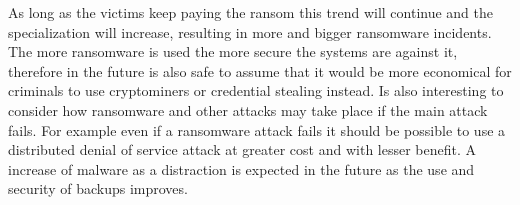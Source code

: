 \linej
As long as the victims keep paying the ransom this trend will continue and the specialization will increase, resulting in more and bigger ransomware incidents.
The more ransomware is used the more secure the systems are against it, therefore in the future is also safe to assume that it would be more economical for criminals to use cryptominers or credential stealing instead\cite{ransomware_malwarebytes}.
\linej
\linej
Is also interesting to consider how ransomware and other attacks may take place if the main attack fails.
For example even if a ransomware attack fails it should be possible to use a distributed denial of service attack at greater cost and with lesser benefit.
A increase of malware as a distraction is expected in the future as the use and security of backups improves\cite{ransomware_economy}.

